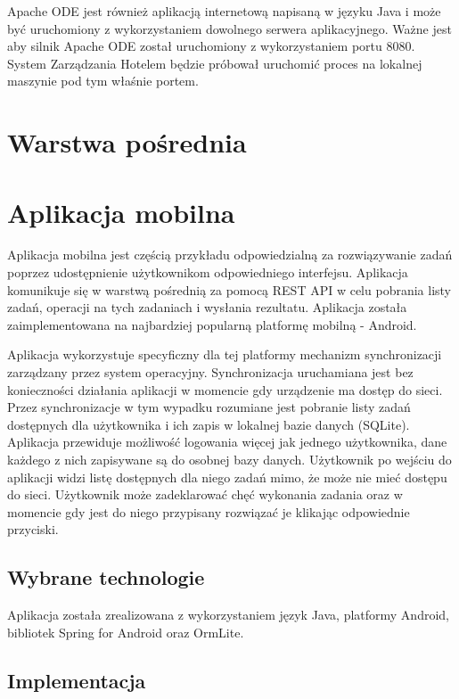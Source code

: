Apache ODE jest również aplikacją internetową napisaną w języku Java i może być uruchomiony z wykorzystaniem dowolnego serwera aplikacyjnego. Ważne jest aby silnik Apache ODE został uruchomiony z wykorzystaniem portu 8080. System Zarządzania Hotelem będzie próbował uruchomić proces na lokalnej maszynie pod tym właśnie portem.  



\section{Warstwa pośrednia }
\label{sec:exampleMiddleware}



\section{Aplikacja mobilna}
\label{sec:exampleMobileApp}

Aplikacja mobilna jest częścią przykładu odpowiedzialną za rozwiązywanie zadań poprzez udostępnienie użytkownikom odpowiedniego interfejsu. Aplikacja komunikuje się w warstwą pośrednią za pomocą REST API w celu pobrania listy zadań, operacji na tych zadaniach i wysłania rezultatu. Aplikacja została zaimplementowana na najbardziej popularną platformę mobilną - Android. 

Aplikacja wykorzystuje specyficzny dla tej platformy mechanizm synchronizacji zarządzany przez system operacyjny. Synchronizacja uruchamiana jest bez konieczności działania aplikacji w momencie gdy urządzenie ma dostęp do sieci. Przez synchronizacje w tym wypadku rozumiane jest pobranie listy zadań dostępnych dla użytkownika i ich zapis w lokalnej bazie danych (SQLite). Aplikacja przewiduje możliwość logowania więcej jak jednego użytkownika, dane każdego z nich zapisywane są do osobnej bazy danych. Użytkownik po wejściu do aplikacji widzi listę dostępnych dla niego zadań mimo, że może nie mieć dostępu do sieci. Użytkownik może zadeklarować chęć wykonania zadania oraz w momencie gdy jest do niego przypisany rozwiązać je klikając odpowiednie przyciski.

\subsection{Wybrane technologie}

Aplikacja została zrealizowana z wykorzystaniem język Java, platformy Android, bibliotek Spring  for Android oraz OrmLite. 

\subsection{Implementacja}